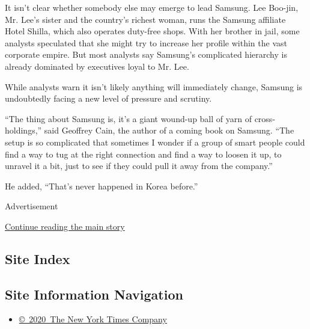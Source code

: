 It isn't clear whether somebody else may emerge to lead Samsung. Lee
Boo-jin, Mr. Lee's sister and the country's richest woman, runs the
Samsung affiliate Hotel Shilla, which also operates duty-free shops.
With her brother in jail, some analysts speculated that she might try to
increase her profile within the vast corporate empire. But most analysts
say Samsung's complicated hierarchy is already dominated by executives
loyal to Mr. Lee.

While analysts warn it isn't likely anything will immediately change,
Samsung is undoubtedly facing a new level of pressure and scrutiny.

``The thing about Samsung is, it's a giant wound-up ball of yarn of
cross-holdings,'' said Geoffrey Cain, the author of a coming book on
Samsung. ``The setup is so complicated that sometimes I wonder if a
group of smart people could find a way to tug at the right connection
and find a way to loosen it up, to unravel it a bit, just to see if they
could pull it away from the company.''

He added, ``That's never happened in Korea before.''

Advertisement

\protect\hyperlink{after-bottom}{Continue reading the main story}

\hypertarget{site-index}{%
\subsection{Site Index}\label{site-index}}

\hypertarget{site-information-navigation}{%
\subsection{Site Information
Navigation}\label{site-information-navigation}}

\begin{itemize}
\tightlist
\item
  \href{https://help.nytimes.com/hc/en-us/articles/115014792127-Copyright-notice}{©~2020~The
  New York Times Company}
\end{itemize}

